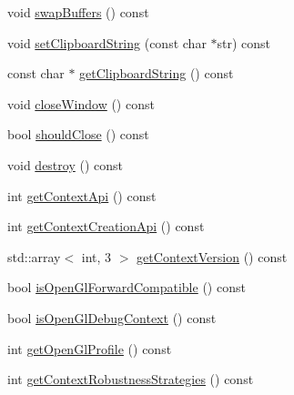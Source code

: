 \begin{DoxyCompactItemize}
\item 
void \mbox{\hyperlink{classec_1_1_window_a92d8c0ad249ed9a069395fac7dbe9455}{swap\+Buffers}} () const
\item 
void \mbox{\hyperlink{classec_1_1_window_a2285600c974d0a2381f84cef3899822f}{set\+Clipboard\+String}} (const char $\ast$str) const
\item 
const char $\ast$ \mbox{\hyperlink{classec_1_1_window_a37ac52444541b9592588c1425a1a5d3d}{get\+Clipboard\+String}} () const
\item 
void \mbox{\hyperlink{classec_1_1_window_aa38b17b4251dee392623910a378f60c3}{close\+Window}} () const
\item 
bool \mbox{\hyperlink{classec_1_1_window_a61d3145f30834d380a4077fc83fb5a54}{should\+Close}} () const
\item 
void \mbox{\hyperlink{classec_1_1_window_ae435819d1caf4349f41867b1d7338209}{destroy}} () const
\end{DoxyCompactItemize}
\textbf{ }\par
\begin{DoxyCompactItemize}
\item 
int \mbox{\hyperlink{classec_1_1_window_ac53f3964af1cd79cdedfebe9a14713a9}{get\+Context\+Api}} () const
\item 
int \mbox{\hyperlink{classec_1_1_window_aec5ca33b1b830d16e2af60d5a7c56535}{get\+Context\+Creation\+Api}} () const
\item 
std\+::array$<$ int, 3 $>$ \mbox{\hyperlink{classec_1_1_window_a30d3b687a175f824e0a9ff00e25078d7}{get\+Context\+Version}} () const
\item 
bool \mbox{\hyperlink{classec_1_1_window_a4664b1d49a0eac0c879a9a24471347e5}{is\+Open\+Gl\+Forward\+Compatible}} () const
\item 
bool \mbox{\hyperlink{classec_1_1_window_a00e2c10258dda2b7120c314c98be9268}{is\+Open\+Gl\+Debug\+Context}} () const
\item 
int \mbox{\hyperlink{classec_1_1_window_aed94b4cfb1b984bc0787dd2c7d42c5e0}{get\+Open\+Gl\+Profile}} () const
\item 
int \mbox{\hyperlink{classec_1_1_window_aa5781c14b7d6d850a5435ba84f3d30e4}{get\+Context\+Robustness\+Strategies}} () const
\end{DoxyCompactItemize}

